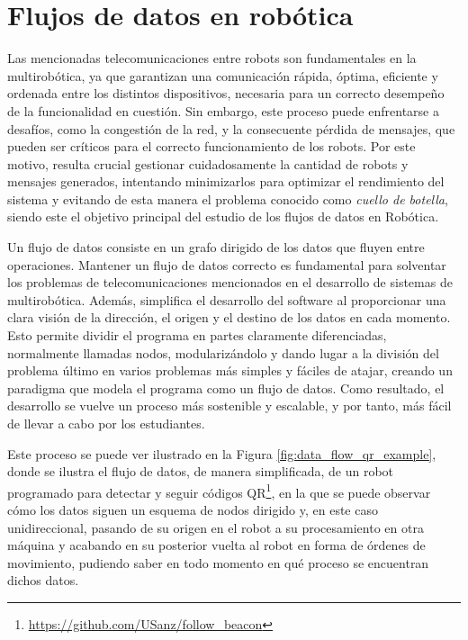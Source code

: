 \section{Flujos de datos en robótica}
\label{sec:flujos_datos} %

Las mencionadas telecomunicaciones entre robots son fundamentales en la
multirobótica, ya que garantizan una comunicación rápida, óptima, eficiente y
ordenada entre los distintos dispositivos, necesaria para un correcto desempeño
de la funcionalidad en cuestión.
Sin embargo, este proceso puede enfrentarse a desafíos, como la congestión de la
red, y la consecuente pérdida de mensajes, que pueden ser críticos para el
correcto funcionamiento de los robots.
Por este motivo, resulta crucial gestionar cuidadosamente la cantidad de robots
y mensajes generados, intentando minimizarlos para optimizar el rendimiento del
sistema y evitando de esta manera el problema conocido como \textit{cuello de
botella}, siendo este el objetivo principal del estudio de los flujos de datos
en Robótica.

Un flujo de datos consiste en un grafo dirigido de los datos que fluyen entre
operaciones.
Mantener un flujo de datos correcto es fundamental para solventar los problemas
de telecomunicaciones mencionados en el desarrollo de sistemas de multirobótica.
Además, simplifica el desarrollo del software al proporcionar una clara visión
de la dirección, el origen y el destino de los datos en cada momento.
Esto permite dividir el programa en partes claramente diferenciadas, normalmente
llamadas nodos, modularizándolo y dando lugar a la división del problema último
en varios problemas más simples y fáciles de atajar, creando un paradigma que
modela el programa como un flujo de datos.
Como resultado, el desarrollo se vuelve un proceso más sostenible y escalable, y
por tanto, más fácil de llevar a cabo por los estudiantes.

Este proceso se puede ver ilustrado en la Figura \ref{fig:data_flow_qr_example},
donde se ilustra el flujo de datos, de manera simplificada, de un robot
programado para detectar y seguir códigos
QR\footnote{\url{https://github.com/USanz/follow_beacon}}, en la que se puede
observar cómo los datos siguen un esquema de nodos dirigido y, en este caso
unidireccional, pasando de su origen en el robot a su procesamiento en otra
máquina y acabando en su posterior vuelta al robot en forma de órdenes de
movimiento, pudiendo saber en todo momento en qué proceso se encuentran dichos
datos.

